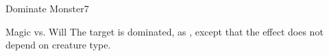 \begin{spellsection}{Dominate Monster}{7}
\begin{spellheader}
\end{spellheader}
\begin{spellcontent}
    \begin{spelltargetinginfo}
    \end{spelltargetinginfo}
    \begin{spelleffects}
        \begin{spellattack}{Magic vs. Will}
            \spellsuccess The target is dominated, as , except that the effect does not depend on creature type.
        \end{spellattack}
    \end{spelleffects}
\end{spellcontent}
\begin{spellfooter}
\end{spellfooter}
\end{spellsection}

